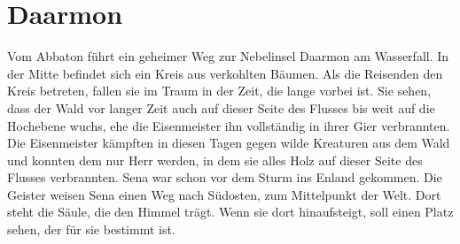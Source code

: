 \documentclass[12pt,a4paper,onecolumn,oneside,ngerman]{book}
\newcommand{\Sena}{Sena}
\newcommand{\Enland}{Enland}
\newcommand{\Darmon}{Daarmon}
\newcommand{\Eisenmeister}{Eisenmeister}
\newcommand{\Abaton}{Abbaton}
\begin{document}
\chapter{\Darmon}
Vom {\Abaton} führt ein geheimer Weg zur Nebelinsel {\Darmon} am Wasserfall. In der Mitte befindet sich ein Kreis aus verkohlten Bäumen.\linebreak
Als die Reisenden den Kreis betreten, fallen sie im Traum in der Zeit, die lange vorbei ist. Sie sehen, dass der Wald vor langer Zeit auch auf dieser Seite des Flusses bis weit auf die Hochebene wuchs, ehe die {\Eisenmeister} ihn vollständig in ihrer Gier verbrannten. Die {\Eisenmeister} kämpften in diesen Tagen gegen wilde Kreaturen aus dem Wald und konnten dem nur Herr werden, in dem sie alles Holz auf dieser Seite des Flusses verbrannten.\linebreak
{\Sena} war schon vor dem Sturm ins {\Enland} gekommen. Die Geister weisen {\Sena} einen Weg nach Südosten, zum Mittelpunkt der Welt. Dort steht die Säule, die den Himmel trägt. Wenn sie dort hinaufsteigt, soll einen Platz sehen, der für sie bestimmt ist.

\end{document}
